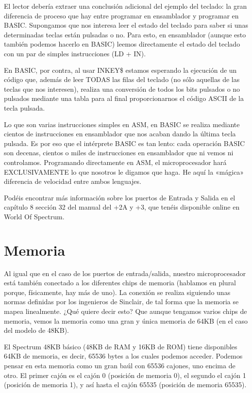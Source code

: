 \documentclass[letterpaper,10pt,spanish]{sphinxmanual}
\begin{document}
El lector debería extraer una conclusión adicional del ejemplo del teclado: la gran diferencia de proceso que hay entre programar en ensamblador y programar en BASIC. Supongamos que nos interesa leer el estado del teclado para saber si unas determinadas teclas están pulsadas o no. Para esto, en ensamblador (aunque esto también podemos hacerlo en BASIC) leemos directamente el estado del teclado con un par de simples instrucciones (LD + IN).

En BASIC, por contra, al usar INKEY\$ estamos esperando la ejecución de un código que, además de leer TODAS las filas del teclado (no sólo aquellas de las teclas que nos interesen), realiza una conversión de todos los bits pulsados o no pulsados mediante una tabla para al final proporcionarnos el código ASCII de la tecla pulsada.

Lo que son varias instrucciones simples en ASM, en BASIC se realiza mediante cientos de instrucciones en ensamblador que nos acaban dando la última tecla pulsada. Es por eso que el intérprete BASIC es tan lento: cada operación BASIC son decenas, cientos o miles de instrucciones en ensamblador que ni vemos ni controlamos. Programando directamente en ASM, el microprocesador hará EXCLUSIVAMENTE lo que nosotros le digamos que haga. He aquí la «mágica» diferencia de velocidad entre ambos lenguajes.

Podéis encontrar más información sobre los puertos de Entrada y Salida en el capítulo 8 sección 32 del manual del +2A y +3, que tenéis disponible online en World Of Spectrum.


\section{Memoria}
\label{\detokenize{03_arquitectura/arquitectura:memoria}}
Al igual que en el caso de los puertos de entrada/salida, nuestro microprocesador está también conectado a los diferentes chips de memoria (hablamos en plural porque, físicamente, hay más de uno). La conexión se realiza siguiendo unas normas definidas por los ingenieros de Sinclair, de tal forma que la memoria se mapea linealmente. ¿Qué quiere decir esto? Que aunque tengamos varios chips de memoria, vemos la memoria como una gran y única memoria de 64KB (en el caso del modelo de 48KB).

El Spectrum 48KB básico (48KB de RAM y 16KB de ROM) tiene disponibles 64KB de memoria, es decir, 65536 bytes a los cuales podemos acceder. Podemos pensar en esta memoria como un gran baúl con 65536 cajones, uno encima de otro. El primer cajón es el cajón 0 (posición de memoria 0), el segundo el cajón 1 (posición de memoria 1), y así hasta el cajón 65535 (posición de memoria 65535).
\end{document}
